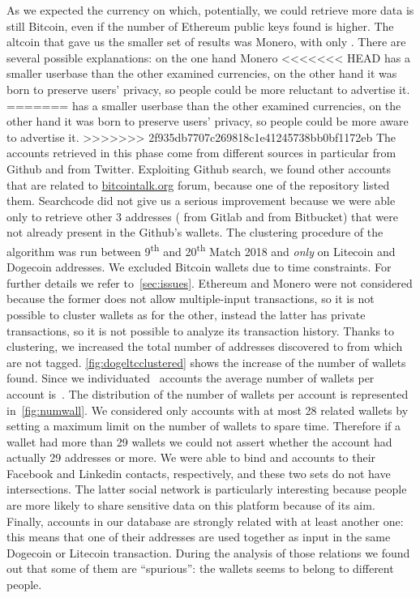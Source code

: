 As we expected the currency on which, potentially, we could retrieve more data
is still Bitcoin, even if the number of Ethereum public keys found is higher.
The altcoin that gave us the smaller set of results was Monero, with only
\startingXMR{}. There are several possible explanations: on the one hand Monero
<<<<<<< HEAD
has a smaller userbase than the other examined currencies, on the other hand it
was born to preserve users' privacy, so people could be more reluctant to
advertise it.
=======
has
a smaller userbase than the other examined currencies, on the other hand it was
born to preserve users' privacy, so people could be more aware to advertise it.
>>>>>>> 2f935db7707c269818c1e41245738bb0bf1172eb
The accounts retrieved in this phase come from different sources in particular
\accountGithub{} from Github and \accountTwitter{} from Twitter.
Exploiting Github search, we found other \accountBitcointalk{}
accounts that are related to \url{bitcointalk.org} forum, because one
of the repository listed them. Searchcode did not give us a serious improvement
because we were able only to retrieve other 3 addresses (\accountGitlab{} from
Gitlab and \accountBitbucket{} from Bitbucket) that were not already present in
the Github's wallets.
The clustering procedure of the algorithm was run between 9\textsuperscript{th}
and 20\textsuperscript{th} Match 2018 and \emph{only} on Litecoin and Dogecoin
addresses. We excluded Bitcoin wallets due to time constraints.
For further details we refer to~\autoref{sec:issues}. Ethereum and Monero were
not considered because the former does not allow multiple-input transactions,
so it is not possible to cluster wallets as for the other, instead the latter
has private transactions, so it is not possible to analyze its transaction
history.
Thanks to clustering, we increased the total number of addresses
discovered
to \clusteringNumberAllWallets{} from which
\clusteringNumberWalletsNotService{} are not tagged.
\autoref{fig:dogeltcclustered} shows the increase of the number of
wallets found.
Since we individuated~\accountNumber{} accounts the average number
of wallets per account is~\avarageAccount{}.
The distribution of the number of wallets per account is represented
in~\autoref{fig:numwall}. We considered only accounts with at most 28 related
wallets by setting a maximum limit on the number of
wallets to spare time.
Therefore if a wallet had more than 29 wallets we could not assert whether
the account had actually 29 addresses or more.
We were able to bind \facebookRelatedAccounts{} and \linkedinRelatedAccount{}
accounts to their Facebook and Linkedin contacts, respectively, and these two
sets do not have intersections. The latter social network is particularly
interesting because people are more likely to share sensitive data on this
platform because of its aim.
Finally, \accountRelated{} accounts in our database are strongly related with
at least another one: this means that one of their addresses are used together
as input in the same Dogecoin or Litecoin transaction. During the analysis of
those relations we found out that some of them are ``spurious'': the wallets
seems to belong to different people.

